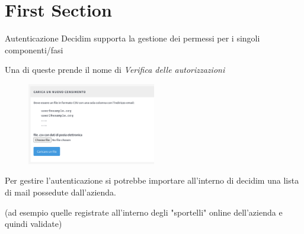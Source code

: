\section{First Section}
\begin{frame}{Autenticazione}
  Decidim supporta la gestione dei permessi per i singoli componenti/fasi

  Una di queste prende il nome di \emph{Verifica delle autorizzazioni}

  \begin{figure}
    \centering
    \includegraphics[width=0.50\textwidth]{images/auth}
  \end{figure}

  Per gestire l'autenticazione si potrebbe importare all'interno di decidim una lista di mail possedute dall'azienda.

  (ad esempio quelle registrate all'interno degli "sportelli" online dell'azienda e quindi validate)

\end{frame}